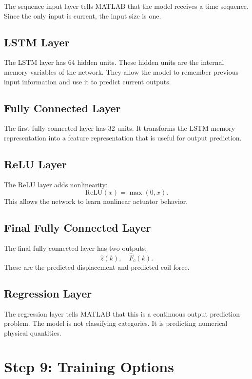 \documentclass[11pt]{article}
\begin{document}
The sequence input layer tells MATLAB that the model receives a time sequence. Since the only input is current, the input size is one.

\subsection{LSTM Layer}

The LSTM layer has 64 hidden units. These hidden units are the internal memory variables of the network. They allow the model to remember previous input information and use it to predict current outputs.

\subsection{Fully Connected Layer}

The first fully connected layer has 32 units. It transforms the LSTM memory representation into a feature representation that is useful for output prediction.

\subsection{ReLU Layer}

The ReLU layer adds nonlinearity:
\[
    \mathrm{ReLU}(x) = \max(0, x).
\]
This allows the network to learn nonlinear actuator behavior.

\subsection{Final Fully Connected Layer}

The final fully connected layer has two outputs:
\[
    \hat{z}(k), \quad \hat{F}_c(k).
\]
These are the predicted displacement and predicted coil force.

\subsection{Regression Layer}

The regression layer tells MATLAB that this is a continuous output prediction problem. The model is not classifying categories. It is predicting numerical physical quantities.

\section{Step 9: Training Options}
\end{document}
